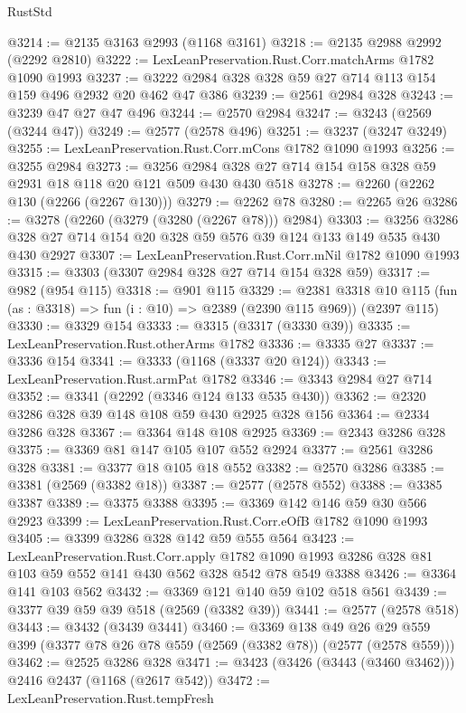\begin{lexlean}{RustStd}
\begin{coremodule}
@3214 := @2135 @3163 @2993 (@1168 @3161)
@3218 := @2135 @2988 @2992 (@2292 @2810)
@3222 := LexLeanPreservation.Rust.Corr.matchArms @1782 @1090 @1993
@3237 := @3222 @2984 @328 @328 @59 @27 @714 @113 @154 @159 @496 @2932 @20 @462 @47 @386
@3239 := @2561 @2984 @328
@3243 := @3239 @47 @27 @47 @496
@3244 := @2570 @2984
@3247 := @3243 (@2569 (@3244 @47))
@3249 := @2577 (@2578 @496)
@3251 := @3237 (@3247 @3249)
@3255 := LexLeanPreservation.Rust.Corr.mCons @1782 @1090 @1993
@3256 := @3255 @2984
@3273 := @3256 @2984 @328 @27 @714 @154 @158 @328 @59 @2931 @18 @118 @20 @121 @509 @430 @430 @518
@3278 := @2260 (@2262 @130 (@2266 (@2267 @130)))
@3279 := @2262 @78
@3280 := @2265 @26
@3286 := @3278 (@2260 (@3279 (@3280 (@2267 @78))) @2984)
@3303 := @3256 @3286 @328 @27 @714 @154 @20 @328 @59 @576 @39 @124 @133 @149 @535 @430 @430 @2927
@3307 := LexLeanPreservation.Rust.Corr.mNil @1782 @1090 @1993
@3315 := @3303 (@3307 @2984 @328 @27 @714 @154 @328 @59)
@3317 := @982 (@954 @115)
@3318 := @901 @115
@3329 := @2381
    @3318
    @10
    @115
    (fun (as : @3318) => fun (i : @10) => @2389 (@2390 @115 @969))
    (@2397 @115)
@3330 := @3329 @154
@3333 := @3315 (@3317 (@3330 @39))
@3335 := LexLeanPreservation.Rust.otherArms @1782
@3336 := @3335 @27
@3337 := @3336 @154
@3341 := @3333 (@1168 (@3337 @20 @124))
@3343 := LexLeanPreservation.Rust.armPat @1782
@3346 := @3343 @2984 @27 @714
@3352 := @3341 (@2292 (@3346 @124 @133 @535 @430))
@3362 := @2320 @3286 @328 @39 @148 @108 @59 @430 @2925 @328 @156
@3364 := @2334 @3286 @328
@3367 := @3364 @148 @108 @2925
@3369 := @2343 @3286 @328
@3375 := @3369 @81 @147 @105 @107 @552 @2924
@3377 := @2561 @3286 @328
@3381 := @3377 @18 @105 @18 @552
@3382 := @2570 @3286
@3385 := @3381 (@2569 (@3382 @18))
@3387 := @2577 (@2578 @552)
@3388 := @3385 @3387
@3389 := @3375 @3388
@3395 := @3369 @142 @146 @59 @30 @566 @2923
@3399 := LexLeanPreservation.Rust.Corr.eOfB @1782 @1090 @1993
@3405 := @3399 @3286 @328 @142 @59 @555 @564
@3423 := LexLeanPreservation.Rust.Corr.apply
    @1782
    @1090
    @1993
    @3286
    @328
    @81
    @103
    @59
    @552
    @141
    @430
    @562
    @328
    @542
    @78
    @549
    @3388
@3426 := @3364 @141 @103 @562
@3432 := @3369 @121 @140 @59 @102 @518 @561
@3439 := @3377 @39 @59 @39 @518 (@2569 (@3382 @39))
@3441 := @2577 (@2578 @518)
@3443 := @3432 (@3439 @3441)
@3460 := @3369
    @138
    @49
    @26
    @29
    @559
    @399
    (@3377 @78 @26 @78 @559 (@2569 (@3382 @78)) (@2577 (@2578 @559)))
@3462 := @2525 @3286 @328
@3471 := @3423 (@3426 (@3443 (@3460 @3462))) @2416 @2437 (@1168 (@2617 @542))
@3472 := LexLeanPreservation.Rust.tempFresh

\end{coremodule}
\end{lexlean}

